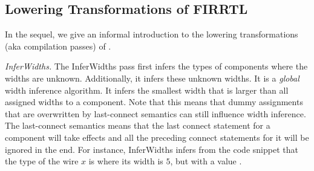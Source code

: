\subsection{Lowering Transformations of FIRRTL}
\label{subsec-lowering-transformations}

In the sequel, we give an informal introduction to the lowering transformations (aka compilation passes) of  {\firrtl}.





%

\smallskip
\noindent\emph{InferWidths.}
The InferWidths pass first infers the types of components where the widths %
are unknown. Additionally, 
it infers these unknown widths.
It is a \emph{global} width inference algorithm.
It infers the smallest width that is larger than all assigned widths to a component. Note that this means that dummy assignments that are overwritten by last-connect semantics can still influence width inference. The last-connect semantics means that the last connect statement for a component will take effects and all the preceding connect statements for it will be ignored  in the end. For instance, InferWidths infers from the code snippet  that the type of the wire $x$ is  where its width is $5$, but with a value .


